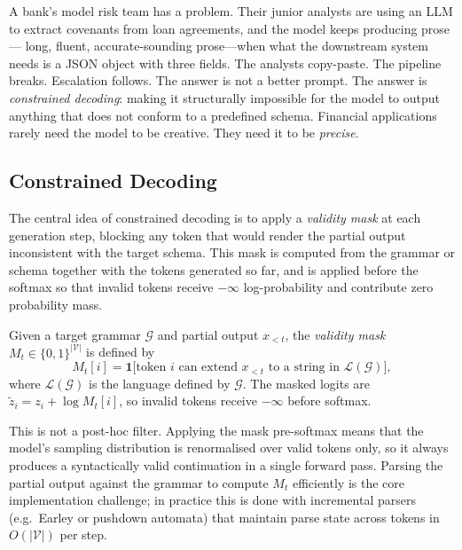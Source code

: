 \begin{context}

A bank's model risk team has a problem.  Their junior analysts are using an LLM
to extract covenants from loan agreements, and the model keeps producing prose---
long, fluent, accurate-sounding prose---when what the downstream system needs is
a JSON object with three fields.  The analysts copy-paste.  The pipeline breaks.
Escalation follows.  The answer is not a better prompt.  The answer is
\emph{constrained decoding}: making it structurally impossible for the model to
output anything that does not conform to a predefined schema.  Financial
applications rarely need the model to be creative.  They need it to be
\emph{precise}.

\subsection{Constrained Decoding}
\label{sec:structured-gen-constrained}

The central idea of constrained decoding is to apply a \emph{validity mask} at each
generation step, blocking any token that would render the partial output inconsistent
with the target schema.  This mask is computed from the grammar or schema together
with the tokens generated so far, and is applied before the softmax so that invalid
tokens receive $-\infty$ log-probability and contribute zero probability mass.

\begin{definition}
\label{def:validity-mask}
Given a target grammar $\mathcal{G}$ and partial output $x_{<t}$, the
\emph{validity mask} $M_t \in \{0,1\}^{|\mathcal{V}|}$ is defined by
\begin{equation}
  M_t[i] = \mathbf{1}\bigl[\text{token } i \text{ can extend } x_{<t}
            \text{ to a string in } \mathcal{L}(\mathcal{G})\bigr],
  \label{eq:validity-mask}
\end{equation}
where $\mathcal{L}(\mathcal{G})$ is the language defined by $\mathcal{G}$.
The masked logits are $\tilde{z}_i = z_i + \log M_t[i]$, so invalid tokens
receive $-\infty$ before softmax.
\end{definition}

This is not a post-hoc filter.  Applying the mask pre-softmax means that the model's
sampling distribution is renormalised over valid tokens only, so it always produces
a syntactically valid continuation in a single forward pass.  Parsing the partial
output against the grammar to compute $M_t$ efficiently is the core implementation
challenge; in practice this is done with incremental parsers (e.g.\ Earley or
pushdown automata) that maintain parse state across tokens in $O(|\mathcal{V}|)$
per step.


\end{context}
